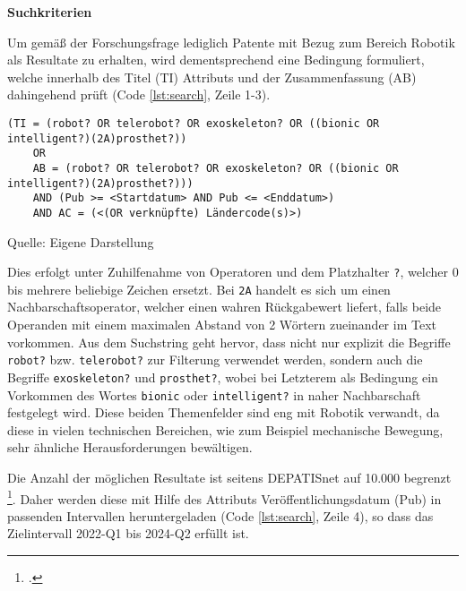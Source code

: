 \textbf{Suchkriterien}

Um gemäß der Forschungsfrage lediglich Patente mit Bezug zum Bereich Robotik als Resultate zu erhalten, wird dementsprechend eine Bedingung formuliert, welche innerhalb des Titel (TI) Attributs und der Zusammenfassung (AB) dahingehend prüft (Code \ref{lst:search}, Zeile 1-3).
\begin{lstlisting}[caption={Eingabe für Expertenrecherche auf DEPATISnet}, label=lst:search, captionpos=t]
	(TI = (robot? OR telerobot? OR exoskeleton? OR ((bionic OR intelligent?)(2A)prosthet?))
	OR 
	AB = (robot? OR telerobot? OR exoskeleton? OR ((bionic OR intelligent?)(2A)prosthet?)))
	AND (Pub >= <Startdatum> AND Pub <= <Enddatum>)
	AND AC = (<(OR verknüpfte) Ländercode(s)>)
\end{lstlisting}
\vspace{-1.3em}
\normalsize{Quelle: Eigene Darstellung}

Dies erfolgt unter Zuhilfenahme von Operatoren und dem Platzhalter \verb|?|, welcher 0 bis mehrere beliebige Zeichen ersetzt. Bei \verb|2A| handelt es sich um einen Nachbarschaftsoperator, welcher einen wahren Rückgabewert liefert, falls beide Operanden mit einem maximalen Abstand von 2 Wörtern zueinander im Text vorkommen. Aus dem Suchstring geht hervor, dass nicht nur explizit die Begriffe \verb|robot?| bzw. \verb|telerobot?| zur Filterung verwendet werden, sondern auch die Begriffe \verb|exoskeleton?| und \verb|prosthet?|, wobei bei Letzterem als Bedingung ein Vorkommen des Wortes \verb|bionic| oder \verb|intelligent?| in naher Nachbarschaft festgelegt wird. Diese beiden Themenfelder sind eng mit Robotik verwandt, da diese in vielen technischen Bereichen, wie zum Beispiel mechanische Bewegung, sehr ähnliche Herausforderungen bewältigen. 

Die Anzahl der möglichen Resultate ist seitens DEPATISnet auf 10.000 begrenzt \footcite[Vgl.][S. 158]{dpma_hilfe}. Daher werden diese mit Hilfe des Attributs Veröffentlichungsdatum (Pub) in passenden Intervallen heruntergeladen (Code \ref{lst:search}, Zeile 4), so dass das Zielintervall 2022-Q1 bis 2024-Q2 erfüllt ist.

